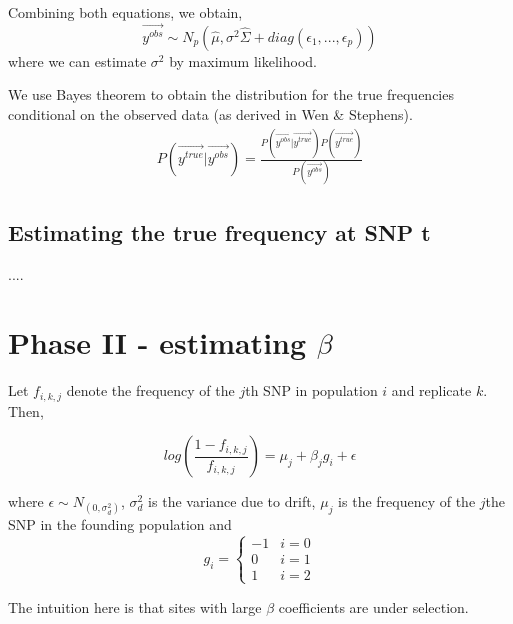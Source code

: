\documentclass[10pt,a4paper,draft]{article}
\begin{document}
Combining both equations, we obtain,
\begin{equation}
 \vec{y^{obs}} \sim N_p(\hat{\mu}, \sigma^2\hat{\Sigma} + diag(\epsilon_1,...,\epsilon_p))
\end{equation}
where we can estimate $\sigma^2$ by maximum likelihood.

We use Bayes theorem to obtain the distribution for the true frequencies conditional on the observed data (as derived in Wen \& Stephens).
\begin{align*}
P(\vec{y^{true}} | \vec{y^{obs}}) = \frac{P(\vec{y^{obs}} | \vec{y^{true}}) P(\vec{y^{true}})}{P(\vec{y^{obs}})} 
\end{align*}

\iffalse
\begin{equation}
\sim N_p\Big((\frac{\hat{\Sigma}^{-1}}{\sigma^2} + \frac{I}{\epsilon^2})^{-1}(\frac{\hat{\Sigma}^{-1}\hat{\mu}}{\sigma^2} + \frac{\vec{y^{obs}}}{\epsilon^2}), (\frac{\hat{\Sigma}^{-1}}{\sigma^2} + \frac{I}{\epsilon^2})^{-1}\Big)\label{likl}
\end{equation}
\fi
\subsection{Estimating the true frequency at SNP t}
....

\section{Phase II - estimating $\beta$}
Let $f_{i,k,j}$ denote the frequency of the $j$th SNP in population $i$ and replicate $k$. Then,

\begin{equation}
log(\frac{1-f_{i,k,j}}{f_{i,k,j}}) = \mu_j + \beta_j g_i + \epsilon
\end{equation}

where $\epsilon \sim N_(0, \sigma_d^2)$, $\sigma_d^2$ is the variance due to drift, $\mu_j$ is the frequency of the $j$the SNP in the founding population and 
\[
   g_{i} = \left\{
     \begin{array}{lr}
       -1 &  i =0\\
        0 &  i =1 \\
        1 &  i =2
     \end{array}
   \right.
\]

The intuition here is that sites with large $\beta$ coefficients are under selection.
\end{document}
